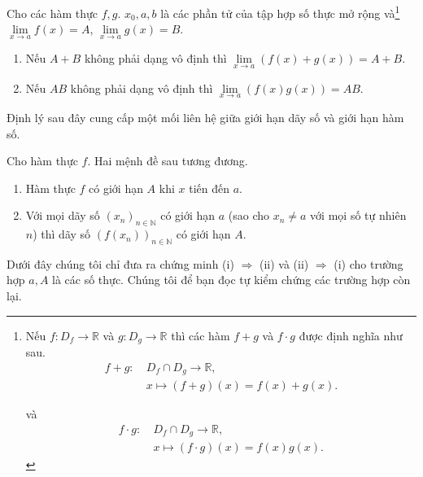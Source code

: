 \begin{theorem}\label{theorem:limits-of-sum-and-product-of-functions}
    Cho các hàm thực $f, g$. $x_{0}, a, b$ là các phần tử của tập hợp số thực mở rộng và\footnote{Nếu $f: D_{f}\to \mathbb{R}$ và $g: D_{g}\to \mathbb{R}$ thì các hàm $f + g$ và $f\cdot g$ được định nghĩa như sau.
        \begin{align*}
            f + g: & \ D_{f}\cap D_{g} \to \mathbb{R},    \\
                   & \ x\mapsto (f + g)(x) = f(x) + g(x).
        \end{align*}

        và
        \begin{align*}
            f\cdot g: & \ D_{f}\cap D_{g} \to \mathbb{R},    \\
                      & \ x\mapsto (f\cdot g)(x) = f(x)g(x).
        \end{align*}} $\lim\limits_{x\to a} f(x) = A$, $\lim\limits_{x\to a} g(x) = B$.
    \begin{enumerate}[label={(\roman*)}]
        \item Nếu $A + B$ không phải dạng vô định thì $\lim\limits_{x\to a} (f(x) + g(x)) = A + B$.
        \item Nếu $AB$ không phải dạng vô định thì $\lim\limits_{x\to a} (f(x)g(x)) = AB$.
    \end{enumerate}
\end{theorem}

Định lý sau đây cung cấp một mối liên hệ giữa giới hạn dãy số và giới hạn hàm số.
\begin{theorem}\label{theorem:limits-of-functions-and-sequences}
    Cho hàm thực $f$. Hai mệnh đề sau tương đương.
    \begin{enumerate}[label={(\roman*)}]
        \item Hàm thực $f$ có giới hạn $A$ khi $x$ tiến đến $a$.
        \item Với mọi dãy số ${(x_{n})}_{n\in\mathbb{N}}$ có giới hạn $a$ (sao cho $x_{n}\ne a$ với mọi số tự nhiên $n$) thì dãy số ${(f(x_{n}))}_{n\in\mathbb{N}}$ có giới hạn $A$.
    \end{enumerate}
\end{theorem}

Dưới đây chúng tôi chỉ đưa ra chứng minh (i) $\Rightarrow$ (ii) và (ii) $\Rightarrow$ (i) cho trường hợp $a, A$ là các số thực. Chúng tôi để bạn đọc tự kiểm chứng các trường hợp còn lại.

